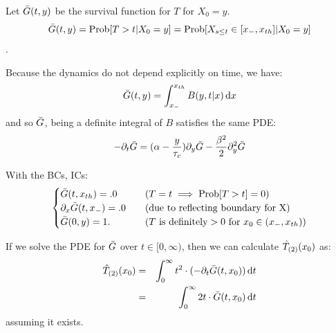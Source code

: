 \documentclass[12pt]{iopart}
\begin{document}
Let ${ \bar{G} }(t,y)$ be the survival function for $T$ for $X_0 = y$.
$${ \bar{G} }(t,y) = \operatorname{Prob}[T>t | X_0 = y] = \operatorname{Prob}[X_{s\leq t} \in [{ x_{-} },
{ x_{th} }] | X_0 = y]$$.

Because the dynamics do not depend explicitly on time, we have:
$$
{ \bar{G} }(t,y) = \int_{ x_{-} }^{ x_{th} } B(y,t|x) \, \mathrm{d} x
$$
and so ${ \bar{G} }$, being a definite integral of $B$ satisfies the same PDE:
\begin{equation}
-{\partial}_t { \bar{G} } = ({\alpha} - \frac y{{ \tau_{c} }}) {\partial}_y{ \bar{G} } - \frac {{\beta}^2} 2 {\partial}_y^2 { \bar{G} }
\label{eq:backward_SDF}
\end{equation}

With the BCs, ICs:
\begin{equation}
\begin{cases}
{ \bar{G} }(t,{ x_{th} }) = .0 & \quad (T = t \implies \operatorname{Prob}[T>t] = 0)
\\
{\partial}_x { \bar{G} }(t,{ x_{-} }) = .0  & \quad (\textrm{due to reflecting boundary for X})
\\
{ \bar{G} }(0, y) = 1. & \quad (T \textrm{ is definitely} > 0 \textrm{ for } x_0 \in
({ x_{-} }, { x_{th} }) )
\end{cases}
\end{equation}

If we solve the PDE for ${ \bar{G} }$ over $t \in [0,\infty)$, then we can calculate
${ \hat{T}_{(2)} }(x_0)$ as:
\begin{eqnarray}
{ \hat{T}_{(2)} }(x_0) &=& \int_0^\infty t^2 \cdot (-{\partial}_t{ \bar{G} }(t,x_0)) \, \mathrm{d} t
\\
		   &=& \int_0^\infty 2t \cdot { \bar{G} }(t,x_0) \, \mathrm{d} t
\end{eqnarray}
assuming it exists.
\end{document}
